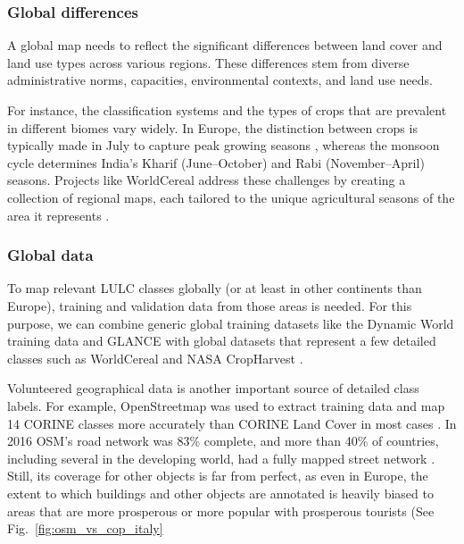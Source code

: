         \subsubsection{Global differences}
        
            A global map needs to reflect the significant differences between land cover and land use types across various regions. These differences stem from diverse administrative norms, capacities, environmental contexts, and land use needs. 
            
            For instance, the classification systems and the types of crops that are prevalent in different biomes vary widely. In Europe, the distinction between crops is typically made in July to capture peak growing seasons \citep{esch2014differentiation,xu2021towards}, whereas the monsoon cycle determines India's Kharif (June--October) and Rabi (November--April) seasons.
            Projects like WorldCereal address these challenges by creating a collection of regional maps, each tailored to the unique agricultural seasons of the area it represents \citep{tricht2023worldcereal}.
            
        \subsubsection{Global data}
            \label{syn:everywhere-globaldata}

            To map relevant LULC classes globally (or at least in other continents than Europe), training and validation data from those areas is needed. For this purpose, we can combine generic global training datasets like the Dynamic World training data \citep{tait2021dwtd} and GLANCE \citep{stanimirova2023global} with global datasets that represent a few detailed classes such as WorldCereal \citep{boogaard2023worldcereal} and NASA CropHarvest \citep{tseng2021cropharvest}. 
            
            Volunteered geographical data is another important source of detailed class labels. For example, OpenStreetmap was used to extract training data and map 14 CORINE classes more accurately than CORINE Land Cover in most cases \citep{schultz2017open}. In 2016 OSM's road network was 83\% complete, and more than 40\% of countries, including several in the developing world, had a fully mapped street network \citep{barrington2017world}. Still, its coverage for other objects is far from perfect, as even in Europe, the extent to which buildings and other objects are annotated is heavily biased to areas that are more prosperous or more popular with prosperous tourists (See Fig.\@~\ref{fig:osm_vs_cop_italy}

